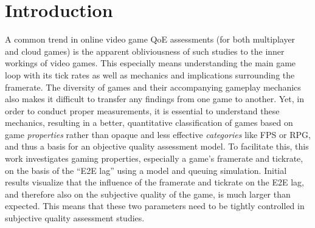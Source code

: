\section{Introduction}
\label{sec:introduction}

A common trend in online video game \gls{QoE} assessments (for both multiplayer and cloud games) is the apparent obliviousness of such studies to the inner workings of video games. This especially means understanding the main game loop with its tick rates as well as mechanics and implications surrounding the framerate. The diversity of games and their accompanying gameplay mechanics also makes it difficult to transfer any findings from one game to another. Yet, in order to conduct proper measurements, it is essential to understand these mechanics, resulting in a better, quantitative classification of games based on game \textit{properties} rather than opaque and less effective \textit{categories} like \gls{FPS} or \gls{RPG}, and thus a basis for an objective quality assessment model. To facilitate this, this work investigates gaming properties, especially a game's framerate and tickrate, on the basis of the ``\gls{E2E} lag'' using a model and queuing simulation. Initial results visualize that the influence of the framerate and tickrate on the \gls{E2E} lag, and therefore also on the subjective quality of the game, is much larger than expected. This means that these two parameters need to be tightly controlled in subjective quality assessment studies.

